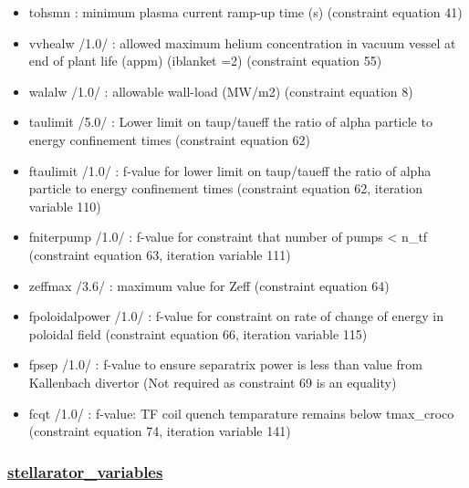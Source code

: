 \documentclass[]{article}
\begin{document}
\begin{itemize}
\item
  tohsmn : minimum plasma current ramp-up time (s) (constraint equation
  41)
\item
  vvhealw /1.0/ : allowed maximum helium concentration in vacuum vessel
  at end of plant life (appm) (iblanket =2) (constraint equation 55)
\item
  walalw /1.0/ : allowable wall-load (MW/m2) (constraint equation 8)
\item
  taulimit /5.0/ : Lower limit on taup/taueff the ratio of alpha
  particle to energy confinement times (constraint equation 62)
\item
  ftaulimit /1.0/ : f-value for lower limit on taup/taueff the ratio of
  alpha particle to energy confinement times (constraint equation 62,
  iteration variable 110)
\item
  fniterpump /1.0/ : f-value for constraint that number of pumps
  \textless{} n_tf (constraint equation 63, iteration variable 111)
\item
  zeffmax /3.6/ : maximum value for Zeff (constraint equation 64)
\item
  fpoloidalpower /1.0/ : f-value for constraint on rate of change of
  energy in poloidal field (constraint equation 66, iteration variable
  115)
\item
  fpsep /1.0/ : f-value to ensure separatrix power is less than value
  from Kallenbach divertor (Not required as constraint 69 is an
  equality)
\item
  fcqt /1.0/ : f-value: TF coil quench temparature remains below
  tmax\_croco (constraint equation 74, iteration variable 141)
\end{itemize}

\hypertarget{stellarator_variables}{%
\subsubsection{\texorpdfstring{\href{stellarator_variables.html}{stellarator\_variables}}{stellarator\_variables}}\label{stellarator_variables}}
\end{document}
